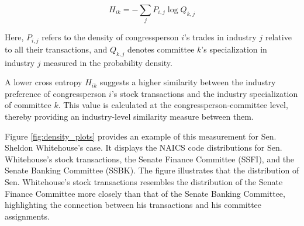 \documentclass[15pt,letterpaper]{article}
\begin{document}
$$H_{i k}=-\sum_j P_{i, j} \log Q_{k, j}$$

Here, $P_{i,j}$ refers to the density of congressperson $i$'s trades in industry $j$ relative to all their transactions, and $Q_{k,j}$ denotes committee $k$'s specialization in industry $j$ measured in the probability density.

A lower cross entropy $H_{ik}$ suggests a higher similarity between the industry preference of congressperson $i$'s stock transactions and the industry specialization of committee $k$. This value is calculated at the congressperson-committee level, thereby providing an industry-level similarity measure between them.

Figure \ref{fig:density_plots} provides an example of this measurement for Sen. Sheldon Whitehouse's case. It displays the NAICS code distributions for Sen. Whitehouse's stock transactions, the Senate Finance Committee (SSFI), and the Senate Banking Committee (SSBK). The figure illustrates that the distribution of Sen. Whitehouse's stock transactions resembles the distribution of the Senate Finance Committee more closely than that of the Senate Banking Committee, highlighting the connection between his transactions and his committee assignments.
\end{document}
